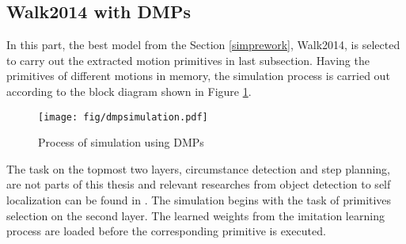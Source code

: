 

\subsection{Walk2014 with DMPs}
In this part, the best model from the Section {\ref{simprework}}, Walk2014, is selected to carry out the extracted motion primitives in last subsection.
Having the primitives of different motions in memory, the simulation process is carried out according to the block diagram shown in Figure {\ref{dmpsimulation}}. 

\begin{figure}[h]
	\centering
	\texttt{[image: fig/dmpsimulation.pdf]}
	\caption{Process of simulation using DMPs}
	\label{dmpsimulation}
\end{figure}

The task on the topmost two layers, circumstance detection and step planning, are not parts of this thesis and relevant researches from object detection to self localization can be found in \cite{hulkspublication}. The simulation begins with the task of primitives selection on the second layer. The learned weights from the imitation learning process are loaded before the corresponding primitive is executed.


%

